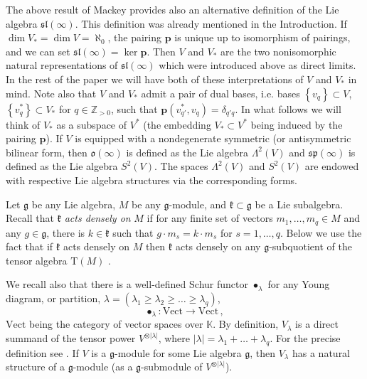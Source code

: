 \documentclass[11pt]{article}
\theoremstyle{plain}
\theoremstyle{nonumberplain}
\theoremstyle{plain}
\theoremstyle{nonumberplain}
\newcommand\bK{\mathbb K}
\newcommand\bZ{\mathbb Z}
\newcommand\fg{\mathfrak{g}}
\newcommand\fk{\mathfrak{k}}
\DeclareMathOperator{\Hom}{\mathrm{Hom}}
\begin{document}
	The above result of Mackey provides also an alternative
        definition of the Lie algebra $\mathfrak{sl}(\infty)$.  This
        definition was already mentioned in the Introduction.  If
        $\dim V_*=\dim V= \aleph_0$, the pairing $\mathbf{p}$ is
        unique up to isomorphism of pairings, and we can set
        $\mathfrak{sl}(\infty)=\ker\mathbf{p}$.  Then $V$ and $V_*$
        are the two nonisomorphic natural representations of
        $\mathfrak{sl}(\infty)$ which were introduced above as direct
        limits.  In the rest of the paper we will have both of these
        interpretations of $V$ and $V_*$ in mind.  Note also that $V$
        and $V_*$ admit a pair of dual bases, i.e. bases
        $\left\{v_q\right\}\subset V$,
        $\left\{v_q^*\right\}\subset V_*$ for $q\in\bZ_{>0}$, such
        that $\mathbf{p}\left(v^*_{q'},v_q\right)=\delta_{q'q}$.  In
        what follows we will think of $V_*$ as a subspace of $V^*$ (the embedding $V_*\subset V^*$ being induced by the pairing
        $\mathbf{p}$).  If $V$ is equipped with a nondegenerate
        symmetric (or antisymmetric bilinear form, then
        $\mathfrak{o}(\infty)$ is defined as the Lie algebra
        $\Lambda^2(V)$ and $\mathfrak{sp}(\infty)$ is defined as the
        Lie algebra $S^2(V)$.  The spaces $\Lambda^2(V)$ and $S^2(V)$
        are endowed with respective Lie algebra structures via the
        corresponding forms.
	
	Let $\fg$ be any Lie algebra, $M$ be any $\fg$-module, and
        $\fk\subset \fg$ be a Lie subalgebra.  Recall that $\fk$
        \emph{acts densely on} $M$ if for any finite set of vectors
        $m_1,\ldots,m_q\in M$ and any $g\in\fg$, there is $k\in\fk$
        such that $g\cdot m_s=k\cdot m_s$ for $s=1,\ldots,q$.  Below
        we use the fact that if $\fk$ acts densely on $M$ then $\fk$
        acts densely on any $\fg$-subquotient of the tensor algebra
        $\mathrm{T}(M)$ \cite[Lemma 7.3]{PS2}.

	We recall also that there is a well-defined Schur functor $\bullet_\lambda$ for any Young diagram, or partition, $\lambda=\left(\lambda_1\geq \lambda_2\geq \ldots\geq \lambda_q\right)$,
	$$\bullet_\lambda:\text{Vect}\to\text{Vect}\,,$$
	$\text{Vect}$ being the category of vector spaces over $\bK$.
        By definition, $V_\lambda$ is a direct summand of the tensor
        power $V^{\otimes|\lambda|}$, where
        $|\lambda|=\lambda_1+\ldots+\lambda_q$.  For the precise
        definition see \cite{Fulton}.  If $V$ is a $\fg$-module for
        some Lie algebra $\fg$, then $V_\lambda$ has a natural
        structure of a $\fg$-module (as a $\fg$-submodule of
        $V^{\otimes |\lambda|}$).
\end{document}
